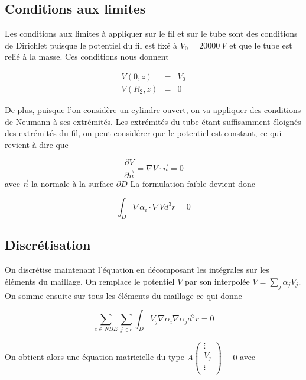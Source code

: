 \documentclass[a4paper,12pt]{article}
\begin{document}
\subsection{Conditions aux limites}
Les conditions aux limites à appliquer sur le fil et sur le tube sont des conditions de Dirichlet puisque le potentiel du fil est fixé à $V_0=\SI{20000}{V}$ et que le tube est relié à la masse. Ces conditions nous donnent



\begin{eqnarray}
V(0,z) &=& V_0 \\
V(R_2,z) &=& 0
\end{eqnarray}


De plus, puisque l'on considère un cylindre ouvert, on va appliquer des conditions de Neumann à ses extrémités. Les extrémités du tube étant suffisamment éloignés des extrémités du fil, on peut considérer que le potentiel est constant, ce qui revient à dire que

\begin{equation}
\frac{\partial V}{\partial \vec{n} } = \nabla V \cdot \vec{n} = 0
\end{equation}
avec $\vec{n}$ la normale à la surface $\partial D$
La formulation faible devient donc

\begin{equation}
\int_{D} \nabla \alpha_i \cdot \nabla V d^3 r = 0
\end{equation}

\subsection{Discrétisation}
On discrétise maintenant l'équation en décomposant les intégrales sur les éléments du maillage. On remplace le potentiel $V$ par son interpolée $V = \sum_{j} \alpha_j V_j$. On somme ensuite sur tous les éléments du maillage ce qui donne

\begin{equation}
\sum_{e \in NBE} \sum_{j \in e} \int_{D} V_j \nabla \alpha_i \nabla \alpha_j d^3 r = 0
\end{equation}

On obtient alors une équation matricielle du type $A 
\left( \begin{array}{c}
\vdots \\
V_j \\
\vdots \\
\end{array} \right) 
 = 0$ avec
\end{document}
